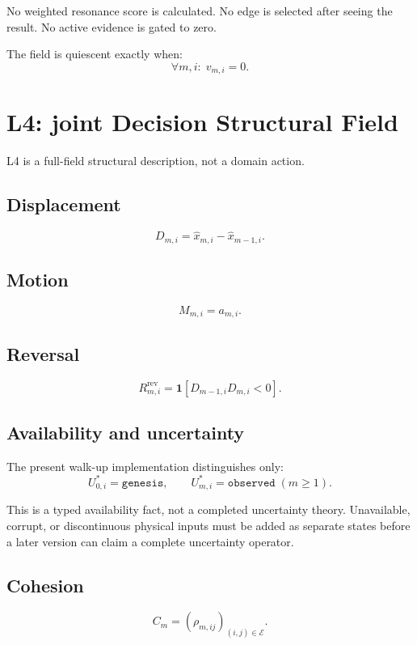 \documentclass[11pt]{article}
\begin{document}
No weighted resonance score is calculated. No edge is selected after seeing
the result. No active evidence is gated to zero.

The field is quiescent exactly when:
\[
  \forall m,i:\;v_{m,i}=0.
\]

\section{L4: joint Decision Structural Field}

L4 is a full-field structural description, not a domain action.

\subsection{Displacement}

\[
  D_{m,i}
  =
  \widehat{x}_{m,i}-\widehat{x}_{m-1,i}.
\]

\subsection{Motion}

\[
  M_{m,i}=a_{m,i}.
\]

\subsection{Reversal}

\[
  R^{\mathrm{rev}}_{m,i}
  =
  \mathbf{1}
  \left[
    D_{m-1,i}D_{m,i}<0
  \right].
\]

\subsection{Availability and uncertainty}

The present walk-up implementation distinguishes only:
\[
  U^{*}_{0,i}=\texttt{genesis},
\qquad
  U^{*}_{m,i}=\texttt{observed}\;(m\geq1).
\]

This is a typed availability fact, not a completed uncertainty theory.
Unavailable, corrupt, or discontinuous physical inputs must be added as
separate states before a later version can claim a complete uncertainty
operator.

\subsection{Cohesion}

\[
  C_m=(\rho_{m,ij})_{(i,j)\in\mathcal{E}}.
\]
\end{document}
